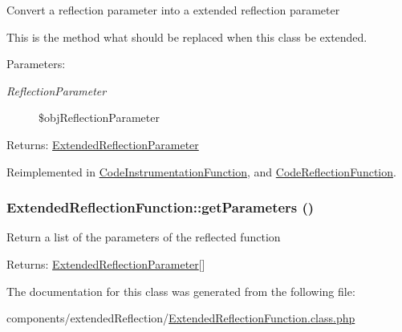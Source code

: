 Convert a reflection parameter into a extended reflection parameter

This is the method what should be replaced when this class be extended.

\begin{Desc}
\item[Parameters:]
\begin{description}
\item[{\em ReflectionParameter}]\$objReflectionParameter \end{description}
\end{Desc}
\begin{Desc}
\item[Returns:]\hyperlink{class_extended_reflection_parameter}{ExtendedReflectionParameter} \end{Desc}


Reimplemented in \hyperlink{class_code_instrumentation_function_3d95491ac661050b8e8ecedfaf3c8359}{CodeInstrumentationFunction}, and \hyperlink{class_code_reflection_function_7ce14d3f6e8579332f226d85fb439b80}{CodeReflectionFunction}.\hypertarget{class_extended_reflection_function_cfebbc64ac5e1b92c4a95c44771989c2}{
\subsubsection[{getParameters}]{\setlength{\rightskip}{0pt plus 5cm}ExtendedReflectionFunction::getParameters ()}}
\label{class_extended_reflection_function_cfebbc64ac5e1b92c4a95c44771989c2}


Return a list of the parameters of the reflected function

\begin{Desc}
\item[Returns:]\hyperlink{class_extended_reflection_parameter}{ExtendedReflectionParameter}\mbox{[}\mbox{]} \end{Desc}


The documentation for this class was generated from the following file:\begin{CompactItemize}
\item 
components/extendedReflection/\hyperlink{_extended_reflection_function_8class_8php}{ExtendedReflectionFunction.class.php}\end{CompactItemize}
